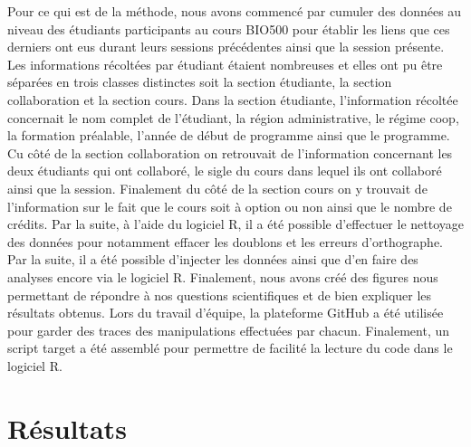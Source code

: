 \documentclass[
]{article}
\begin{document}
Pour ce qui est de la méthode, nous avons commencé par cumuler des
données au niveau des étudiants participants au cours BIO500 pour
établir les liens que ces derniers ont eus durant leurs sessions
précédentes ainsi que la session présente. Les informations récoltées
par étudiant étaient nombreuses et elles ont pu être séparées en trois
classes distinctes soit la section étudiante, la section collaboration
et la section cours. Dans la section étudiante, l'information récoltée
concernait le nom complet de l'étudiant, la région administrative, le
régime coop, la formation préalable, l'année de début de programme ainsi
que le programme. Cu côté de la section collaboration on retrouvait de
l'information concernant les deux étudiants qui ont collaboré, le sigle
du cours dans lequel ils ont collaboré ainsi que la session. Finalement
du côté de la section cours on y trouvait de l'information sur le fait
que le cours soit à option ou non ainsi que le nombre de crédits. Par la
suite, à l'aide du logiciel R, il a été possible d'effectuer le
nettoyage des données pour notamment effacer les doublons et les erreurs
d'orthographe. Par la suite, il a été possible d'injecter les données
ainsi que d'en faire des analyses encore via le logiciel R. Finalement,
nous avons créé des figures nous permettant de répondre à nos questions
scientifiques et de bien expliquer les résultats obtenus. Lors du
travail d'équipe, la plateforme GitHub a été utilisée pour garder des
traces des manipulations effectuées par chacun. Finalement, un script
target a été assemblé pour permettre de facilité la lecture du code dans
le logiciel R.

\hypertarget{ruxe9sultats}{%
\section{Résultats}\label{ruxe9sultats}}
\end{document}
